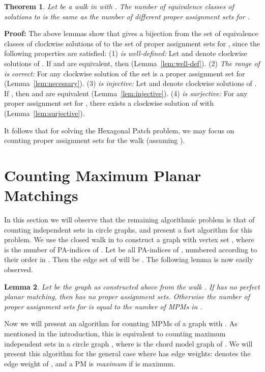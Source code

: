 \documentclass{llncs}
\newcommand{\PF}{{\bf Proof: }}
\newcommand{\QED}{\hspace*{\fill}{}\medskip}
\newtheorem{thm}{Theorem}
\newtheorem{lem}[thm]{Lemma}
\begin{document}
\begin{thm}
\label{thm:equivalence}
Let  be a walk in  with . The number of equivalence classes of solutions to  is the same as the number of different proper assignment sets for .
\end{thm}
\PF
The above lemmas show that  gives a bijection from
the set of equivalence classes of clockwise solutions of 
to the set of proper assignment sets for , since the following properties are satisfied:
(1) \emph{ is well-defined:} Let  and  denote clockwise solutions of . If  and  are equivalent, then  (Lemma~\ref{lem:well-def}).
(2) \emph{The range of  is correct:} For any clockwise solution  of  the set  is a proper assignment set for  (Lemma~\ref{lem:necessary}).
(3) \emph{ is injective:}  Let  and  denote clockwise solutions of . If , then  and  are equivalent (Lemma~\ref{lem:injective}).
(4) \emph{ is surjective:} For any proper assignment set  for , there exists a clockwise solution  of  with  (Lemma~\ref{lem:surjective}).
\QED

It follows that for solving the Hexagonal Patch problem, we may focus on counting proper assignment sets for the walk  (assuming ).

\section{Counting Maximum Planar Matchings}
\label{sec:circlegraphs}


In this section we will observe that the remaining algorithmic problem is that of counting independent sets in circle graphs, and present a fast algorithm for this problem.
We use the closed walk  in  to construct a graph
 with vertex set , where  is the number of PA-indices of . Let  be all PA-indices of , numbered according to their order in . Then the edge set of  will be
.
The following lemma is now easily observed.

\begin{lem}
\label{lem:equiv_to_MPM}
Let  be the graph as constructed above from the walk .
If  has no perfect planar matching, then  has no proper assignment sets. Otherwise the number of proper assignment sets for  is equal to the number of MPMs in .
\end{lem}



Now we will present an algorithm for counting MPMs of a graph  with . As mentioned in the introduction, this is equivalent to counting maximum independent sets in a circle graph , where  is the chord model graph of .
We will present this algorithm for the general case where  has edge weights:  denotes the edge weight of , and a PM  is {\em maximum} if  is maximum.
\end{document}
